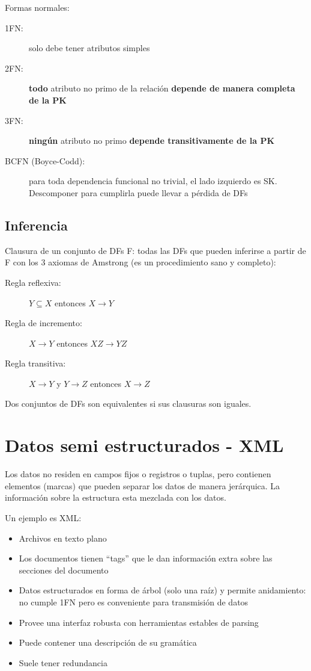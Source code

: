 Formas normales:

\begin{description}
	\item[1FN:] solo debe tener atributos simples
	\item[2FN:] \textbf{todo} atributo no primo de la relación \textbf{depende de manera completa de la PK}
	\item[3FN:] \textbf{ningún} atributo no primo \textbf{depende transitivamente de la PK}
	\item[BCFN (Boyce-Codd):] para toda dependencia funcional no trivial, el lado izquierdo es SK. Descomponer para cumplirla puede llevar a pérdida de DFs
\end{description}

\subsection{Inferencia}

Clausura de un conjunto de DFs F: todas las DFs que pueden inferirse a partir de F con los 3 axiomas de Amstrong (es un procedimiento sano y completo):

\begin{description}
	\item[Regla reflexiva:] $Y \subseteq X$ entonces $X \to Y$
	\item[Regla de incremento:] $X \to Y$ entonces $XZ \to YZ$
	\item[Regla transitiva:] $X \to Y$ y $Y \to Z$ entonces $X \to Z$
\end{description}

Dos conjuntos de DFs son equivalentes si sus clausuras son iguales.

\section{Datos semi estructurados - XML}

Los datos no residen en campos fijos o registros o tuplas,
pero contienen elementos (marcas) que pueden separar los
datos de manera jerárquica.
La información sobre la estructura esta mezclada con los
datos.

Un ejemplo es XML:

\begin{itemize}
	\item Archivos en texto plano
	\item Los documentos tienen “tags” que le dan información extra sobre las secciones del documento
	\item Datos estructurados en forma de árbol (solo una raíz) y permite anidamiento: no cumple 1FN pero es conveniente para transmisión de datos
	\item Provee una interfaz robusta con herramientas estables de parsing
	\item Puede contener una descripción de su gramática
	\item Suele tener redundancia
\end{itemize}

